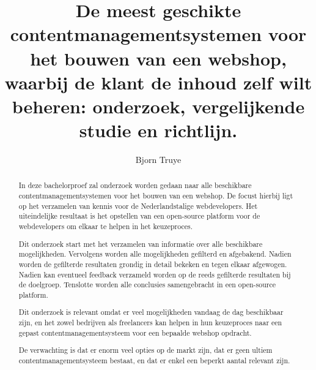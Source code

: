 \documentclass{hogent-article}
\title{De meest geschikte contentmanagementsystemen voor het bouwen van een webshop, waarbij de klant de inhoud zelf wilt beheren: onderzoek, vergelijkende studie en richtlijn.}
\author{Bjorn Truye}
\begin{document}
\begin{abstract}
 In deze bachelorproef zal onderzoek worden gedaan naar alle beschikbare contentmanagementsystemen voor het bouwen van een webshop. De focust hierbij ligt op het verzamelen van kennis voor de Nederlandstalige webdevelopers. Het uiteindelijke resultaat is het opstellen van een open-source platform voor de webdevelopers om elkaar te helpen in het keuzeproces.
  
 Dit onderzoek start met het verzamelen van informatie over alle beschikbare mogelijkheden. Vervolgens worden alle mogelijkheden gefilterd en afgebakend. Nadien worden de gefilterde resultaten grondig in detail bekeken en tegen elkaar afgewogen. Nadien kan eventueel feedback verzameld worden op de reeds gefilterde resultaten bij de doelgroep. Tenslotte worden alle conclusies samengebracht in een open-source platform.   
 
 Dit onderzoek is relevant omdat er veel mogelijkheden vandaag de dag beschikbaar zijn, en het zowel bedrijven als freelancers kan helpen in hun keuzeproces naar een gepast contentmanagementsysteem voor een bepaalde webshop opdracht.
 
 De verwachting is dat er enorm veel opties op de markt zijn, dat er geen ultiem contentmanagementsysteem bestaat, en dat er enkel een beperkt aantal relevant zijn.
   
\end{abstract}

\tableofcontents



\printbibliography[heading=bibintoc]
\end{document}
